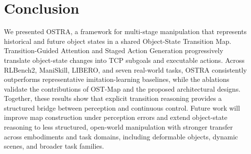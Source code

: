 \section{Conclusion}

We presented OSTRA, a framework for multi-stage manipulation that represents
historical and future object states in a shared Object-State Transition Map.
Transition-Guided Attention and Staged Action Generation progressively translate
object-state changes into TCP subgoals and executable actions. Across RLBench2,
ManiSkill, LIBERO, and seven real-world tasks, OSTRA consistently outperforms
representative imitation-learning baselines, while the ablations validate the
contributions of OST-Map and the proposed architectural designs. Together,
these results show that explicit transition reasoning provides a structured
bridge between perception and continuous control. Future work will improve map
construction under perception errors and extend object-state reasoning to less
structured, open-world manipulation with stronger transfer across embodiments
and task domains, including deformable objects, dynamic scenes, and broader
task families.
